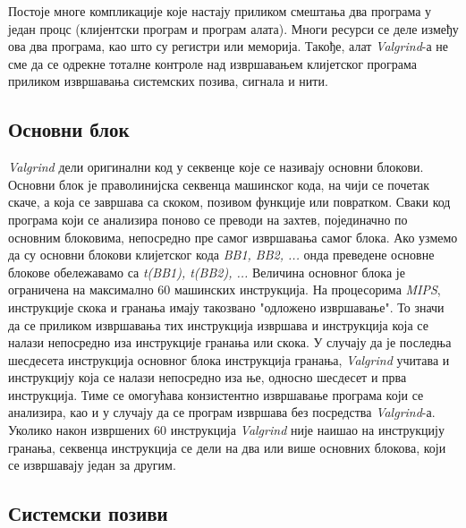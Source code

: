 \documentclass[12pt,oneside]{memoir}
\begin{document}
\indent Постоје многе компликације које настају приликом смештања два програма у један процс (клијентски програм и програм алата). Многи ресурси се деле између ова два програма, као што су регистри или меморија. Такође, алат \textit{Valgrind}-а не сме да се одрекне тоталне контроле над извршавањем клијетског програма приликом извршавања системских позива, сигнала и нити.

\subsection{Основни блок}

\indent \textit{Valgrind} дели оригинални код у секвенце које се називају основни блокови. Основни блок је праволинијска секвенца машинског кода, на чији се почетак скаче, а која се завршава са скоком, позивом функције или повратком. Сваки код програма који се анализира поново се преводи на захтев, појединачно по основним блоковима, непосредно пре самог извршавања самог блока. Ако узмемо да су основни блокови клијетског кода \textit{BB1, BB2, ...} онда преведене основне блокове обележавамо са \textit{t(BB1), t(BB2), ...} Величина основног блока је ограничена на максимално 60 машинских инструкција. На процесорима \textit{MIPS}, инструкције скока и гранања имају такозвано "одложено извршавање". То значи да се приликом извршавања тих инструкција извршава и инструкција која се налази непосредно иза инструкције гранања или скока. У случају да је последња шесдесета инструкција основног блока инструкција гранања, \textit{Valgrind} учитава и инструкцију која се налази непосредно иза ње, односно шесдесет и прва инструкција. Тиме се омогућава конзистентно извршавање програма који се анализира, као и у случају да се програм извршава без посредства \textit{Valgrind}-а. Уколико након извршених 60 инструкција \textit{Valgrind} није наишао на инструкцију гранања, секвенца инструкција се дели на два или више основних блокова, који се извршавају један за другим.



\subsection{Системски позиви}
\end{document}
